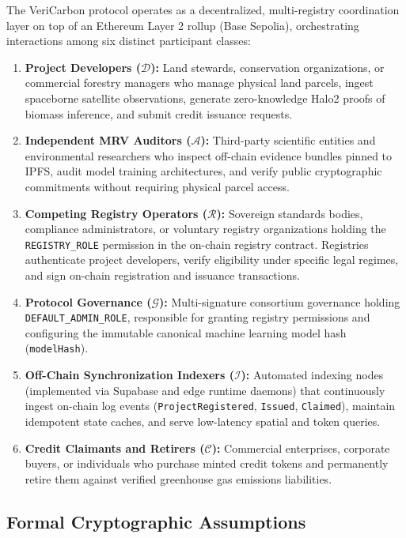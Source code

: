\documentclass[preprint,12pt]{elsarticle}
\begin{document}
The VeriCarbon protocol operates as a decentralized, multi-registry coordination layer on top of an Ethereum Layer 2 rollup (Base Sepolia), orchestrating interactions among six distinct participant classes:
\begin{enumerate}
\item \textbf{Project Developers ($\mathcal{D}$):} Land stewards, conservation organizations, or commercial forestry managers who manage physical land parcels, ingest spaceborne satellite observations, generate zero-knowledge Halo2 proofs of biomass inference, and submit credit issuance requests.
\item \textbf{Independent MRV Auditors ($\mathcal{A}$):} Third-party scientific entities and environmental researchers who inspect off-chain evidence bundles pinned to IPFS, audit model training architectures, and verify public cryptographic commitments without requiring physical parcel access.
\item \textbf{Competing Registry Operators ($\mathcal{R}$):} Sovereign standards bodies, compliance administrators, or voluntary registry organizations holding the \texttt{REGISTRY\_ROLE} permission in the on-chain registry contract. Registries authenticate project developers, verify eligibility under specific legal regimes, and sign on-chain registration and issuance transactions.
\item \textbf{Protocol Governance ($\mathcal{G}$):} Multi-signature consortium governance holding \texttt{DEFAULT\_ADMIN\_ROLE}, responsible for granting registry permissions and configuring the immutable canonical machine learning model hash (\texttt{modelHash}).
\item \textbf{Off-Chain Synchronization Indexers ($\mathcal{I}$):} Automated indexing nodes (implemented via Supabase and edge runtime daemons) that continuously ingest on-chain log events (\texttt{ProjectRegistered}, \texttt{Issued}, \texttt{Claimed}), maintain idempotent state caches, and serve low-latency spatial and token queries.
\item \textbf{Credit Claimants and Retirers ($\mathcal{C}$):} Commercial enterprises, corporate buyers, or individuals who purchase minted credit tokens and permanently retire them against verified greenhouse gas emissions liabilities.
\end{enumerate}

\subsection{Formal Cryptographic Assumptions}
\end{document}
